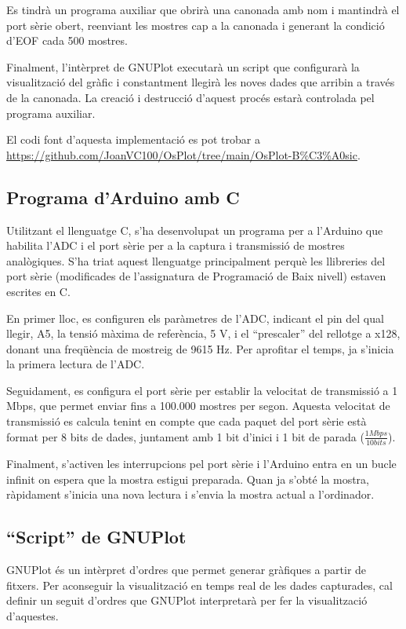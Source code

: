 \documentclass{tfgitic}[2023/06/30]
\begin{document}
Es tindrà un programa auxiliar que obrirà una canonada amb nom i
mantindrà el port sèrie obert, reenviant les mostres cap a la canonada
i generant la condició d'EOF cada 500 mostres.

Finalment, l'intèrpret de GNUPlot executarà un script que configurarà
la visualització del gràfic i constantment llegirà les noves dades que
arribin a través de la canonada. La creació i destrucció d'aquest
procés estarà controlada pel programa auxiliar.

El codi font d'aquesta implementació es pot trobar a
\url{https://github.com/JoanVC100/OsPlot/tree/main/OsPlot-B%C3%A0sic}.

\subsection{Programa d'Arduino amb C}
\label{programa-arduino-c}

Utilitzant el llenguatge C, s'ha desenvolupat un programa per a
l'Arduino que habilita l'ADC i el port sèrie per a la captura i
transmissió de mostres analògiques. S'ha triat aquest llenguatge
principalment perquè les llibreries del port sèrie (modificades de
l'assignatura de Programació de Baix nivell) estaven escrites en C.

En primer lloc, es configuren els paràmetres de l'ADC, indicant el pin
del qual llegir, A5, la tensió màxima de referència, 5 V, i el
``prescaler'' del rellotge a x128, donant una freqüència de mostreig
de 9615 Hz. Per aprofitar el temps, ja s'inicia la primera lectura de
l'ADC.

Seguidament, es configura el port sèrie per establir la velocitat de
transmissió a 1 Mbps, que permet enviar fins a 100.000 mostres per
segon. Aquesta velocitat de transmissió es calcula tenint en compte
que cada paquet del port sèrie està format per 8 bits de dades,
juntament amb 1 bit d'inici i 1 bit de parada ($\frac{1 Mbps}
{10 bits}$).

Finalment, s'activen les interrupcions pel port sèrie i l'Arduino
entra en un bucle infinit on espera que la mostra estigui
preparada. Quan ja s'obté la mostra, ràpidament s'inicia una nova
lectura i s'envia la mostra actual a l'ordinador.

\subsection{``Script'' de GNUPlot}

GNUPlot és un intèrpret d'ordres que permet generar gràfiques a partir
de fitxers. Per aconseguir la visualització en temps real de les dades
capturades, cal definir un seguit d'ordres que GNUPlot interpretarà
per fer la visualització d'aquestes.
\end{document}

